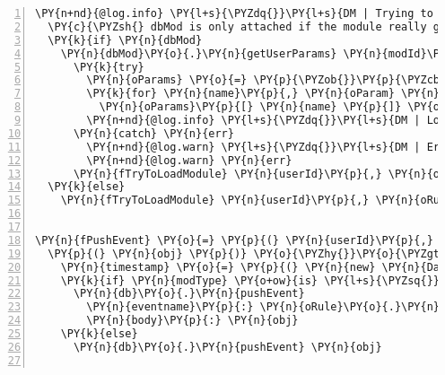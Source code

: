 \begin{Verbatim}[fontsize=\scriptsize,commandchars=\\\{\},numbers=left,firstnumber=1,stepnumber=1]
  \PY{n+nd}{@log.info} \PY{l+s}{\PYZdq{}}\PY{l+s}{DM | Trying to fetch user specific module }\PY{l+s}{\PYZsq{}}\PY{l+s}{\PYZsh{}\PYZob{} modId \PYZcb{}}\PY{l+s}{\PYZsq{}}\PY{l+s}{ paramters for user }\PY{l+s}{\PYZsq{}}\PY{l+s}{\PYZsh{}\PYZob{} userId \PYZcb{}}\PY{l+s}{\PYZsq{}}\PY{l+s}{\PYZdq{}}
  \PY{c}{\PYZsh{} dbMod is only attached if the module really gets loaded}
  \PY{k}{if} \PY{n}{dbMod}
    \PY{n}{dbMod}\PY{o}{.}\PY{n}{getUserParams} \PY{n}{modId}\PY{p}{,} \PY{n}{userId}\PY{p}{,} \PY{p}{(} \PY{n}{err}\PY{p}{,} \PY{n}{obj} \PY{p}{)} \PY{o}{=}\PY{o}{\PYZgt{}}
      \PY{k}{try}
        \PY{n}{oParams} \PY{o}{=} \PY{p}{\PYZob{}}\PY{p}{\PYZcb{}}
        \PY{k}{for} \PY{n}{name}\PY{p}{,} \PY{n}{oParam} \PY{n}{of} \PY{n}{JSON}\PY{o}{.}\PY{n}{parse} \PY{n}{obj}
          \PY{n}{oParams}\PY{p}{[} \PY{n}{name} \PY{p}{]} \PY{o}{=} \PY{n}{encryption}\PY{o}{.}\PY{n}{decrypt} \PY{n}{oParam}\PY{o}{.}\PY{n}{value}
        \PY{n+nd}{@log.info} \PY{l+s}{\PYZdq{}}\PY{l+s}{DM | Loaded user defined params for \PYZsh{}\PYZob{} userId \PYZcb{}, \PYZsh{}\PYZob{} oRule.id \PYZcb{}, \PYZsh{}\PYZob{} modId \PYZcb{}}\PY{l+s}{\PYZdq{}}
      \PY{n}{catch} \PY{n}{err}
        \PY{n+nd}{@log.warn} \PY{l+s}{\PYZdq{}}\PY{l+s}{DM | Error during parsing of user defined params for \PYZsh{}\PYZob{} userId \PYZcb{}, \PYZsh{}\PYZob{} oRule.id \PYZcb{}, \PYZsh{}\PYZob{} modId \PYZcb{}}\PY{l+s}{\PYZdq{}}
        \PY{n+nd}{@log.warn} \PY{n}{err}
      \PY{n}{fTryToLoadModule} \PY{n}{userId}\PY{p}{,} \PY{n}{oRule}\PY{p}{,} \PY{n}{modId}\PY{p}{,} \PY{n}{src}\PY{p}{,} \PY{n}{modType}\PY{p}{,} \PY{n}{dbMod}\PY{p}{,} \PY{n}{oParams}\PY{p}{,} \PY{n}{cb}
  \PY{k}{else}
    \PY{n}{fTryToLoadModule} \PY{n}{userId}\PY{p}{,} \PY{n}{oRule}\PY{p}{,} \PY{n}{modId}\PY{p}{,} \PY{n}{src}\PY{p}{,} \PY{n}{modType}\PY{p}{,} \PY{n}{dbMod}\PY{p}{,} \PY{n}{null}\PY{p}{,} \PY{n}{cb}


\PY{n}{fPushEvent} \PY{o}{=} \PY{p}{(} \PY{n}{userId}\PY{p}{,} \PY{n}{oRule}\PY{p}{,} \PY{n}{modType} \PY{p}{)} \PY{o}{\PYZhy{}}\PY{o}{\PYZgt{}}
  \PY{p}{(} \PY{n}{obj} \PY{p}{)} \PY{o}{\PYZhy{}}\PY{o}{\PYZgt{}}
    \PY{n}{timestamp} \PY{o}{=} \PY{p}{(} \PY{n}{new} \PY{n}{Date}\PY{p}{(}\PY{p}{)} \PY{p}{)}\PY{o}{.}\PY{n}{toISOString}\PY{p}{(}\PY{p}{)}
    \PY{k}{if} \PY{n}{modType} \PY{o+ow}{is} \PY{l+s}{\PYZsq{}}\PY{l+s}{eventpoller}\PY{l+s}{\PYZsq{}}
      \PY{n}{db}\PY{o}{.}\PY{n}{pushEvent}
        \PY{n}{eventname}\PY{p}{:} \PY{n}{oRule}\PY{o}{.}\PY{n}{eventname} \PY{o}{+} \PY{l+s}{\PYZsq{}}\PY{l+s}{\PYZus{}created:}\PY{l+s}{\PYZsq{}} \PY{o}{+} \PY{n}{oRule}\PY{o}{.}\PY{n}{timestamp}
        \PY{n}{body}\PY{p}{:} \PY{n}{obj}
    \PY{k}{else}
      \PY{n}{db}\PY{o}{.}\PY{n}{pushEvent} \PY{n}{obj}


\end{Verbatim}

